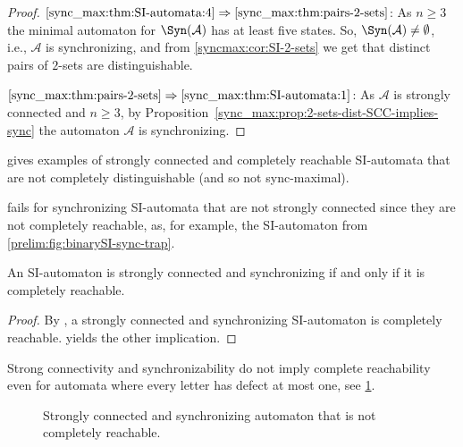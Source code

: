 \begin{proof}
	$\ref{sync_max:thm:SI-automata:4} \Rightarrow \ref{sync_max:thm:pairs-2-sets}$:
	As $n \ge 3$
	the minimal automaton for $\Syn(\mathcal A)$ has at least
	five states. 
	So, $\Syn(\mathcal A) \ne \emptyset$, i.e., $\mathcal A$ is synchronizing,
	and from \cref{syncmax:cor:SI-2-sets}
	we get that distinct pairs of $2$-sets are distinguishable.
	
	$\ref{sync_max:thm:pairs-2-sets} \Rightarrow \ref{sync_max:thm:SI-automata:1}$:
	As $\mathcal A$ is strongly connected and $n \ge 3$, by 
	Proposition~\ref{sync_max:prop:2-sets-dist-SCC-implies-sync}
	the automaton $\mathcal A$ is synchronizing. 
\end{proof}

gives examples of strongly connected and completely
reachable SI-automata that are not completely distinguishable (and so not sync-maximal).

fails for synchronizing SI-automata
that are not strongly connected since they are not completely reachable,
as, for example, the SI-automaton from \cref{prelim:fig:binarySI-sync-trap}.

\begin{corollary}\label{sync_max:cor:SIcr}
	An SI-automaton is strongly connected
	and synchronizing if and only if it is completely reachable.
\end{corollary}
\begin{proof}
	By ,
	a strongly connected and synchronizing
	SI-automaton is completely reachable.
	 yields the other implication.
\end{proof}

Strong connectivity and synchronizability do not imply complete reachability
even for automata where every letter has defect at most one,
see \cref{syncmax:fig:SCC-sync-not-cr}.

\begin{figure}[htb]
	\centering
{}
	\caption{Strongly connected and synchronizing automaton that is not completely reachable.}
	\label{syncmax:fig:SCC-sync-not-cr}
\end{figure}

